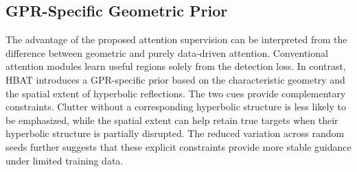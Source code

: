 \documentclass[lettersize,journal]{IEEEtran}
\begin{document}








\subsection{GPR-Specific Geometric Prior}
The advantage of the proposed attention supervision can be interpreted from the difference between geometric and purely data-driven attention. Conventional attention modules learn useful regions solely from the detection loss. 
In contrast, HBAT introduces a GPR-specific prior based on the characteristic geometry and the spatial extent of hyperbolic reflections. 
The two cues provide complementary constraints. Clutter without a corresponding hyperbolic structure is less likely to be emphasized, while the spatial extent can help retain true targets when their hyperbolic structure is partially disrupted.
The reduced variation across random seeds further suggests that these explicit constraints provide more stable guidance under limited training data.
\end{document}
